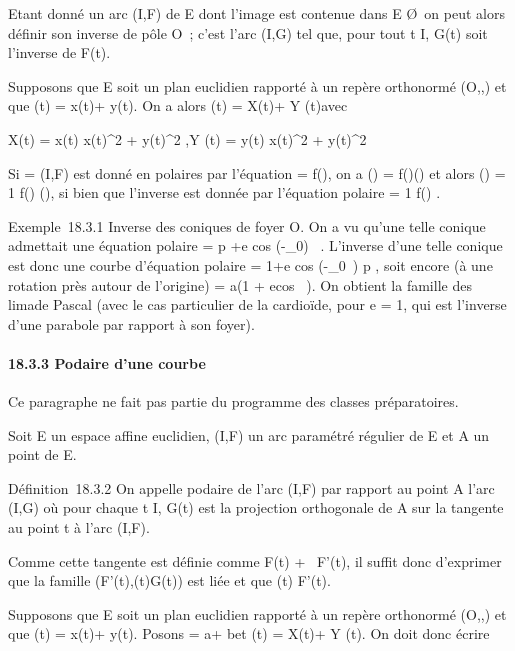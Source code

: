 \documentclass[]{article}
\begin{document}
Etant donné un arc (I,F) de E dont l'image est contenue dans E
\diagdown\O\, on peut alors définir son
inverse de pôle O~; c'est l'arc (I,G) tel que, pour tout t \in I, G(t)
soit l'inverse de F(t).

Supposons que E soit un plan euclidien rapporté à un repère orthonormé
(O,\vec\imath,) et que
\overrightarrowOF(t) = x(t)\vec\imath +
y(t). On a alors
\overrightarrowOG(t) = X(t)\vec\imath +
Y (t) avec

X(t) = x(t) \over x(t)^2 +
y(t)^2 ,\quad Y (t) = y(t)
\over x(t)^2 + y(t)^2

Si \Gamma = (I,F) est donné en polaires par l'équation \rho = f(\theta), on a
\overrightarrowOF(\theta) =
f(\theta)\vecu(\theta) et alors
\overrightarrowOG(\theta) = 1 \over
f(\theta) \vecu(\theta), si bien que l'inverse est donnée par
l'équation polaire \rho = 1 \over f(\theta) .

Exemple~18.3.1 Inverse des coniques de foyer O. On a vu qu'une telle
conique admettait une équation polaire \rho = p +e cos (\theta-\theta_0)~ . L'inverse d'une
telle conique est donc une courbe d'équation polaire \rho =
1+e cos (\theta-\theta_0~) \over
p , soit encore (à une rotation près autour de l'origine) \rho = a(1 +
ecos~ \theta). On obtient la famille des
lima\ccons de Pascal (avec le cas particulier de la
cardioïde, pour e = 1, qui est l'inverse d'une parabole par rapport à
son foyer).

\paragraph{18.3.3 Podaire d'une courbe}

Ce paragraphe ne fait pas partie du programme des classes préparatoires.

Soit E un espace affine euclidien, (I,F) un arc paramétré régulier de E
et A un point de E.

Définition~18.3.2 On appelle podaire de l'arc (I,F) par rapport au point
A l'arc (I,G) où pour chaque t \in I, G(t) est la projection orthogonale
de A sur la tangente au point t à l'arc (I,F).

Comme cette tangente est définie comme F(t) + ~F'(t), il suffit donc
d'exprimer que la famille
(F'(t),\overrightarrowF(t)G(t)) est liée et que
\overrightarrowAG(t) \bot F'(t).

Supposons que E soit un plan euclidien rapporté à un repère orthonormé
(O,\vec\imath,) et que
\overrightarrowOF(t) = x(t)\vec\imath +
y(t). Posons
\overrightarrowOA = a\vec\imath +
b et \overrightarrowOG(t) =
X(t)\vec\imath + Y (t). On doit
donc écrire
\end{document}
